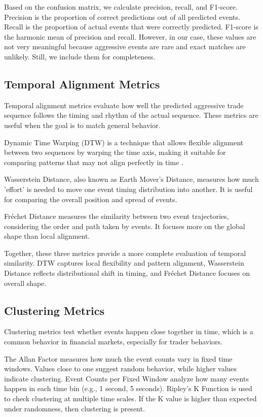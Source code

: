 Based on the confusion matrix, we calculate precision, recall, and F1-score. Precision is the proportion of correct predictions out of all predicted events. Recall is the proportion of actual events that were correctly predicted. F1-score is the harmonic mean of precision and recall. However, in our case, these values are not very meaningful because aggressive events are rare and exact matches are unlikely. Still, we include them for completeness.

\subsection{Temporal Alignment Metrics}
Temporal alignment metrics evaluate how well the predicted aggressive trade sequence follows the timing and rhythm of the actual sequence. These metrics are useful when the goal is to match general behavior.

Dynamic Time Warping (DTW) is a technique that allows flexible alignment between two sequences by warping the time axis, making it suitable for comparing patterns that may not align perfectly in time \citep{muller2007dtw}. 

Wasserstein Distance, also known as Earth Mover's Distance, measures how much 'effort' is needed to move one event timing distribution into another. It is useful for comparing the overall position and spread of events.

Fréchet Distance measures the similarity between two event trajectories, considering the order and path taken by events. It focuses more on the global shape than local alignment.

Together, these three metrics provide a more complete evaluation of temporal similarity. DTW captures local flexibility and pattern alignment, Wasserstein Distance reflects distributional shift in timing, and Fréchet Distance focuses on overall shape.

\subsection{Clustering Metrics}
Clustering metrics test whether events happen close together in time, which is a common behavior in financial markets, especially for trader behaviors.

The Allan Factor measures how much the event counts vary in fixed time windows. Values close to one suggest random behavior, while higher values indicate clustering. Event Counts per Fixed Window analyze how many events happen in each time bin (e.g., 1 second, 5 seconds). Ripley's K Function is used to check clustering at multiple time scales. If the K value is higher than expected under randomness, then clustering is present.

